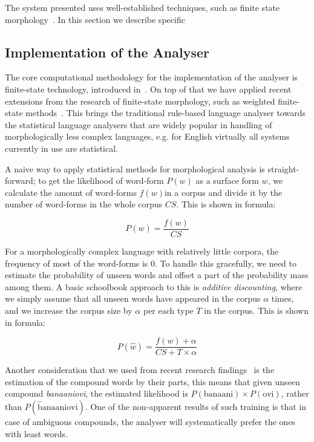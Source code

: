 \documentclass[a4paper,12pt]{article}
\begin{document}
The system presented uses well-established techniques, such as
finite state morphology~\cite{beesley2003finite}. In this section we
describe specific

\subsection{Implementation of the Analyser}

The core computational methodology for the implementation of the analyser is
finite-state technology, introduced
in~\cite{koskenniemi1983twolevel,beesley2003finite}. On top of that we
have applied recent extensions from the research of finite-state morphology,
such as weighted finite-state methods~\cite{openfst,hfst2012}. This brings the
traditional rule-based language analyser towards the statistical language
analysers that are widely popular in handling of morphologically less
complex languages, e.g. for English virtually all systems currently in use
are statistical.

A naive way to apply statistical methods for morphological analysis is
straight-forward; to get the likelihood of word-form $P(w)$ as a surface form
$w$, we calculate the amount of word-forms $f(w)$in a corpus and divide it by
the number of word-forms in the whole corpus $CS$. This is shown in formula:

$$
P(w) = \frac{f(w)}{CS}
$$

For a morphologically complex language with relatively little corpora, the
frequency of most of the word-forms is $0$. To handle this gracefully, we need
to estimate the probability of unseen words and offset a part of the
probability mass among them. A basic schoolbook approach to this is
\emph{additive discounting}, where we simply assume that all unseen words have
appeared in the corpus $\alpha$ times, and we increase the corpus size by
$\alpha$ per each type $T$ in the corpus. This is shown in formula:

$$
P(\hat w) = \frac{f(w) + \alpha}{CS + T \times \alpha}
$$

Another consideration that we used from recent research
findings~\cite{pirinen2009weighting} is the estimation of the compound words by
their parts, this means that given unseen compound \emph{banaaniovi}, the
estimated likelihood is $P(\mathrm{banaani}) \times P(\mathrm{ovi})$, rather
than $P(\mathrm{\hat banaaniovi})$. One of the non-apparent results of such
training is that in case of ambiguous compounds, the analyser will
systematically prefer the ones with least words.
\end{document}
